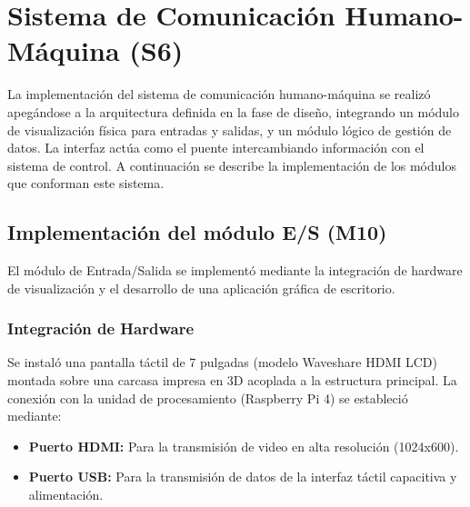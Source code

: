 \section{Sistema de Comunicación Humano-Máquina (S6)}
La implementación del sistema de comunicación humano-máquina se realizó apegándose a la arquitectura definida en la fase de diseño, integrando un módulo de visualización física para entradas y salidas, y un módulo lógico de gestión de datos. La interfaz actúa como el puente intercambiando información con el sistema de control. A continuación se describe la implementación de los módulos que conforman este sistema.

\subsection{Implementación del módulo E/S (M10)}

El módulo de Entrada/Salida se implementó mediante la integración de hardware de visualización y el desarrollo de una aplicación gráfica de escritorio.

\subsubsection{Integración de Hardware}
Se instaló una pantalla táctil de 7 pulgadas (modelo Waveshare HDMI LCD) montada sobre una carcasa impresa en 3D acoplada a la estructura principal. La conexión con la unidad de procesamiento (Raspberry Pi 4) se estableció mediante:
\begin{itemize}
	\item \textbf{Puerto HDMI:} Para la transmisión de video en alta resolución (1024x600).
	\item \textbf{Puerto USB:} Para la transmisión de datos de la interfaz táctil capacitiva y alimentación.
\end{itemize}


